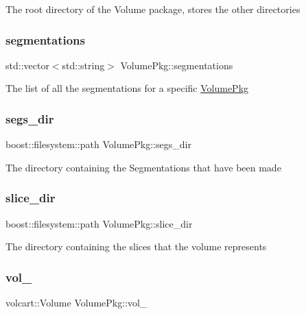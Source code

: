 The root directory of the Volume package, stores the other directories \hypertarget{classVolumePkg_a2c66b1685cb4b0be679097a61acb822b}{}\label{classVolumePkg_a2c66b1685cb4b0be679097a61acb822b} 
\subsubsection{\texorpdfstring{segmentations}{segmentations}}
{\footnotesize\ttfamily std\+::vector$<$std\+::string$>$ Volume\+Pkg\+::segmentations\hspace{0.3cm}{\ttfamily [private]}}

The list of all the segmentations for a specific \hyperlink{classVolumePkg}{Volume\+Pkg} \hypertarget{classVolumePkg_a7093bd35d5d8d7ef0b50a1e182bfbf56}{}\label{classVolumePkg_a7093bd35d5d8d7ef0b50a1e182bfbf56} 
\subsubsection{\texorpdfstring{segs\+\_\+dir}{segs\_dir}}
{\footnotesize\ttfamily boost\+::filesystem\+::path Volume\+Pkg\+::segs\+\_\+dir\hspace{0.3cm}{\ttfamily [private]}}

The directory containing the Segmentations that have been made \hypertarget{classVolumePkg_a277efff0ba8ce1043c83d15eaf5c5427}{}\label{classVolumePkg_a277efff0ba8ce1043c83d15eaf5c5427} 
\subsubsection{\texorpdfstring{slice\+\_\+dir}{slice\_dir}}
{\footnotesize\ttfamily boost\+::filesystem\+::path Volume\+Pkg\+::slice\+\_\+dir\hspace{0.3cm}{\ttfamily [private]}}

The directory containing the slices that the volume represents \hypertarget{classVolumePkg_a0df52f6f476a106802da0bfc1b2d5b23}{}\label{classVolumePkg_a0df52f6f476a106802da0bfc1b2d5b23} 
\subsubsection{\texorpdfstring{vol\+\_\+}{vol\_}}
{\footnotesize\ttfamily volcart\+::\+Volume Volume\+Pkg\+::vol\+\_\+\hspace{0.3cm}{\ttfamily [private]}}

